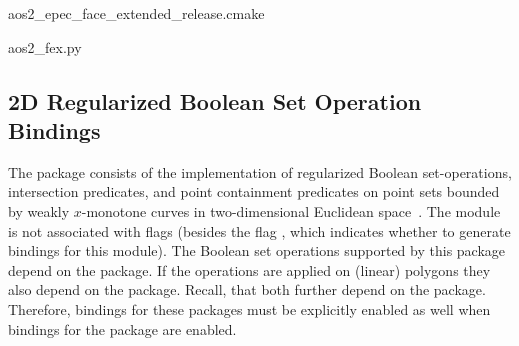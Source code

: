 \begin{lstfloat}
  \def\filename{aos2_epec_face_extended_release.cmake}%
                  {\cmakeDir\filename}
\end{lstfloat}

\begin{lstfloat}
  \def\filename{aos2_fex.py}%
  
                  {\pythonDir\filename}
\end{lstfloat}

\subsection{2D Regularized Boolean Set Operation Bindings}
\label{ssec:modules:bso2}
The \cgal{} package \iiDRegularizedBooleanSetOperationsPackage{}
consists of the implementation of regularized Boolean set-operations,
intersection predicates, and point containment predicates on point
sets bounded by weakly $x$-monotone curves in two-dimensional
Euclidean space~\cite{cgal:fwzh-rbso2-21a}. The
\iiDRegularizedBooleanSetOperationsPackage{} module is not associated
with \cmake{} flags (besides the flag
, which indicates
whether to generate bindings for this module). The Boolean set
operations supported by this package depend on the
\iiDArrangementsPackage{} package. If the operations are applied on
(linear) polygons they also depend on the \iiDPolygonsPackage{}
package. Recall, that both further depend on the
\iiDandiiiDGeometryKernelPackage{} package. Therefore, bindings for
these packages must be explicitly enabled as well when bindings for
the \iiDRegularizedBooleanSetOperationsPackage{} package are enabled.

